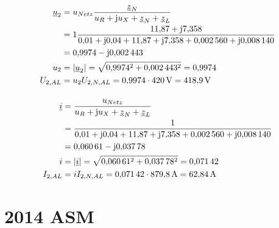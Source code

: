 \documentclass[11pt,a4paper]{scrartcl}
\DeclarePairedDelimiter{\abs}{\lvert}{\rvert}
\renewcommand{\j}{\mathrm{j}}
\newcommand{\z}{\underline{z}}
\renewcommand{\u}{\underline{u}}
\renewcommand{\i}{\underline{i}}
\newcommand{\0}{_{\mybr{0}}}
\newcommand{\1}{_{\mybr{1}}}
\newcommand{\2}{_{\mybr{2}}}
\newcommand{\USA}{U_{2,AL}}
\newcommand{\ISA}{I_{2,AL}}
\newcommand{\USNA}{U_{2,N,AL}}
\newcommand{\ISNA}{I_{2,N,AL}}
\begin{document}
\subsection{}
\begin{align}
\u_2&=u_{Netz}\frac{\z_N}{u_R+\j u_X+\z_N+\z_L}\\
&=1\frac{\num{11.87}+\j\num{7.358}}{\num{0.01}+\j\num{0.04}+\num{11.87}+\j\num{7.358}+\num{0.002560}+\j\num{0.008140}}\\
&=\num{0.9974}-\j\num{0.002443}\\
u_2&=\abs{\u_2}=\sqrt{\num{0.9974}^2+\num{0.002443}^2}=\num{0.9974}\\
\USA&=u_2\USNA=\num{0.9974}\cdot\SI{420}{\volt}=\SI{418.9}{\volt}
\end{align}

\subsection{}
\begin{align}
\i&=\frac{u_{Netz}}{u_R+\j u_X+\z_N+\z_L}\\
&=\frac{1}{\num{0.01}+\j\num{0.04}+\num{11.87}+\j\num{7.358}+\num{0.002560}+\j\num{0.008140}}\\
&=\num{0.06061}-\j\num{0.03778}\\
i&=\abs{\i}=\sqrt{\num{0.06061}^2+\num{0.03778}^2}=\num{0.07142}\\
\ISA&=i\ISNA=\num{0.07142}\cdot\SI{879.8}{\ampere}=\SI{62.84}{\ampere}
\end{align}


\clearpage
\part{2014 ASM}
\section{}
\end{document}

